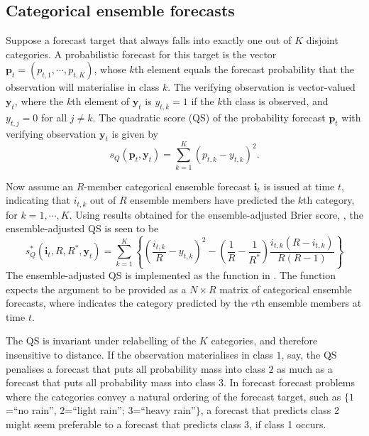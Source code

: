 \documentclass[article]{jss}\usepackage[]{graphicx}\usepackage[]{color}
\begin{document}
\subsection{Categorical ensemble forecasts}

Suppose a forecast target that always falls into exactly one out of $K$ disjoint categories.
A probabilistic forecast for this target is the vector $\mathbf{p}_t = (p_{t,1}, \cdots, p_{t,K})$, whose $k$th element equals the forecast probability that the observation will materialise in class $k$.
The verifying observation is vector-valued $\mathbf{y}_t$, where the $k$th element of $\mathbf{y}_t$ is $y_{t,k}=1$ if the $k$th class is observed, and $y_{t,j}=0$ for all $j\neq k$. 
The quadratic score (QS) of the probability forecast $\mathbf{p}_t$ with verifying observation $\mathbf{y}_t$ is given by
%
\begin{equation}
s_{Q}(\mathbf{p}_t, \mathbf{y}_t) = \sum_{k=1}^K \left(p_{t,k} - y_{t,k}\right)^2.
\end{equation}


Now assume an $R$-member categorical ensemble forecast $\mathbf{i}_t$ is issued at time $t$, indicating that $i_{t,k}$ out of $R$ ensemble members have predicted the $k$th category, for $k=1,\cdots,K$.
Using results obtained for the ensemble-adjusted Brier score, \citep[see also][]{ferro2008effect}, the ensemble-adjusted QS is seen to be
%
\begin{equation}
s_{Q}^*(\mathbf{i}_t, R, R^*, \mathbf{y}_t) = \sum_{k=1}^K \left\{ \left(\frac{i_{t,k}}{R} - y_{t,k}\right)^2 - \left(\frac{1}{R} - \frac{1}{R^*}\right) \frac{i_{t,k}(R-i_{t,k})}{R(R-1)}\right\}
\end{equation}
%
The ensemble-adjusted QS is implemented as the function  in .
The function expects the argument  to be provided as a $N\times R$ matrix of categorical ensemble forecasts, where  indicates the category predicted by the $r$th ensemble members at time $t$. 

The QS is invariant under relabelling of the $K$ categories, and therefore insensitive to distance. 
If the observation materialises in class $1$, say, the QS penalises a forecast that puts all probability mass into class $2$ as much as a forecast that puts all probability mass into class $3$.
In forecast forecast problems where the categories convey a natural ordering of the forecast target, such as $\{1$=``no rain'', $2$=``light rain''; $3$=``heavy rain''$\}$, a forecast that predicts class 2 might seem preferable to a forecast that predicts class 3, if class 1 occurs. 
\end{document}

